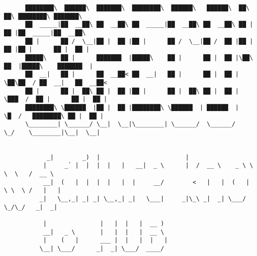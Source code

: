 \documentclass[varwidth=\maxdimen,margin=0.5cm,multi={verbatim}]{standalone}
\begin{document}
\begin{verbatim}
      ████████\  ██████\  ███████\  ████████\  ██████\   ██████\  ██\    ██\ ████████\ ███████\
      ██  _____|██  __██\ ██  __██\ ██  _____|██  __██\ ██  __██\ ██ |   ██ |██  _____|██  __██\
      ██ |      ██ /  \__|██ |  ██ |██ |      ██ /  \__|██ /  ██ |██ |   ██ |██ |      ██ |  ██ |
      █████\    ██ |      ███████  |█████\    ██ |      ██ |  ██ |\██\  ██  |█████\    ███████  |
      ██  __|   ██ |      ██  __██< ██  __|   ██ |      ██ |  ██ | \██\██  / ██  __|   ██  __██<
      ██ |      ██ |  ██\ ██ |  ██ |██ |      ██ |  ██\ ██ |  ██ |  \███  /  ██ |      ██ |  ██ |
      ████████\ \██████  |██ |  ██ |████████\ \██████  | ██████  |   \█  /   ████████\ ██ |  ██ |
      \________| \______/ \__|  \__|\________| \______/  \______/     \_/    \________|\__|  \__|


            _|        _)  |                        |
           |     _` |  |  |  |   |   __|  _ \      |  /  __ \    _ \ \ \  \   /  __ \
           __|  (   |  |  |  |   |  |     __/        <   |   |  (   | \ \  \ /   |   |
          _|   \__,_| _| _| \__,_| _|   \___|     _|\_\ _|  _| \___/   \_/\_/   _|  _|

           |               |   |  |   |  __ )
           __|   _ \       |   |  |   |  __ \
           |    (   |      ___ |  |   |  |   |
          \__| \___/      _|  _| \___/  ____/




\end{verbatim}
\end{document}
